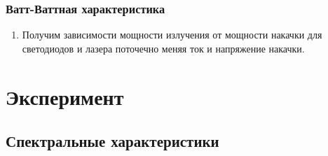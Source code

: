 \documentclass[a4paper]{article}
\begin{document}
        \subsubsection{Ватт-Ваттная характеристика}
        
            \begin{enumerate}
                \item Получим зависимости мощности излучения от мощности накачки для светодиодов и лазера поточечно меняя ток и напряжение накачки.
            \end{enumerate}
            
    
\section{Эксперимент}
    \subsection{Спектральные характеристики}
    
\end{document}

